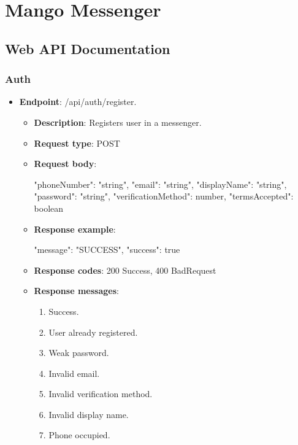 \chapter{Mango Messenger}\label{ch:mango-messenger}


\section{Web API Documentation}\label{sec:web-api-documentation}

\subsection{Auth}\label{subsec:auth}
\begin{itemize}
    \item \textbf{Endpoint}: /api/auth/register.
    \begin{itemize}
        \item \textbf{Description}: Registers user in a messenger.
        \item \textbf{Request type}: POST
        \item \textbf{Request body}:
        \begin{spverbatim}
        {
            "phoneNumber": "string",
            "email": "string",
            "displayName": "string",
            "password": "string",
            "verificationMethod": number,
            "termsAccepted": boolean
        }
        \end{spverbatim}
        \item  \textbf{Response example}:
        \begin{spverbatim}
        {
            "message": "SUCCESS",
            "success": true
        }
        \end{spverbatim}
        \item \textbf{Response codes}: 200 Success, 400 BadRequest
        \item \textbf{Response messages}:
        \begin{enumerate}
            \item Success.
            \item User already registered.
            \item Weak password.
            \item Invalid email.
            \item Invalid verification method.
            \item Invalid display name.
            \item Phone occupied.
        \end{enumerate}
    \end{itemize}


\end{itemize}
